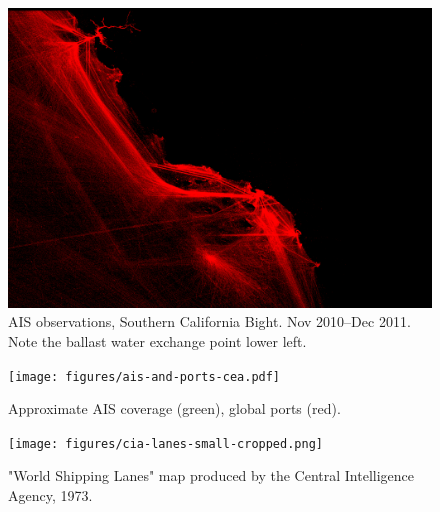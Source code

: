 \begin{figure}[htbp]
  \centering
  \includegraphics[width=140mm]{figures/cargo_density.png}
  \caption[AIS Observations, Southern California Bight]{AIS observations, Southern California Bight. Nov 2010--Dec 2011. Note the ballast water exchange point lower left.}
  \label{fig:cal-cargo}
\end{figure}

\begin{figure}[htbp]
  \centering
  \texttt{[image: figures/ais-and-ports-cea.pdf]}
  \caption[AIS coverage]{Approximate AIS coverage (green), global ports (red).}
  \label{fig:ais-coverage}
\end{figure}

\begin{figure}[htbp]
  \centering
  \texttt{[image: figures/cia-lanes-small-cropped.png]}
  \caption[CIA World Shipping Lanes]{"World Shipping Lanes" map produced by the Central Intelligence Agency, 1973.}
  \label{fig:cia-shipping-map}
\end{figure}


